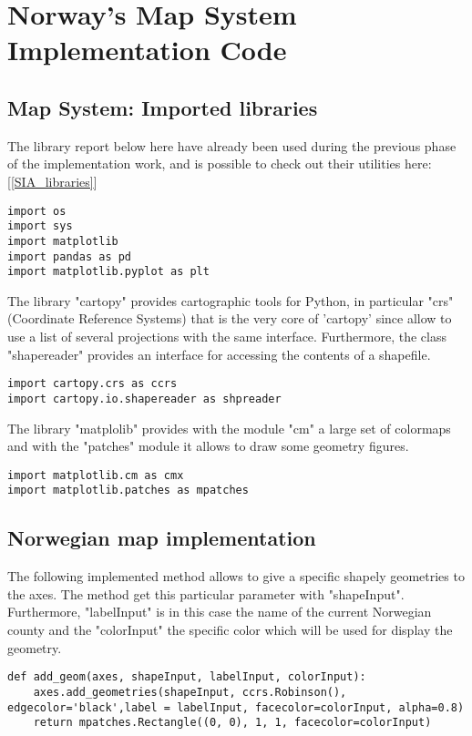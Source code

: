 \chapter{Norway's Map System Implementation Code}
\label{Map_System}
\section{Map System: Imported libraries}
\label{Map_libraries}
The library report below here have already been used during the previous phase of the implementation work, and is possible to check out their utilities here: [\ref{SIA_libraries}]
\begin{lstlisting}
import os
import sys
import matplotlib
import pandas as pd
import matplotlib.pyplot as plt
\end{lstlisting}

The library "cartopy" provides cartographic tools for Python, in particular "crs" (Coordinate Reference Systems) that is the very core of 'cartopy' since allow to use a list of several projections with the same interface. Furthermore, the class "shapereader" provides an interface for accessing the contents of a shapefile.
\begin{lstlisting}
import cartopy.crs as ccrs
import cartopy.io.shapereader as shpreader
\end{lstlisting}

The library "matplolib" provides with the module "cm" a large set of colormaps and with the "patches" module it allows to draw some geometry figures.
\begin{lstlisting}
import matplotlib.cm as cmx
import matplotlib.patches as mpatches
\end{lstlisting}

\section{Norwegian map implementation}
\label{Map_system_implementation}
The following implemented method allows to give a specific shapely geometries to the axes. The method get this particular parameter with "shapeInput". Furthermore, "labelInput" is in this case the name of the current Norwegian county and the "colorInput" the specific color which will be used for display the geometry.
\begin{lstlisting}
def add_geom(axes, shapeInput, labelInput, colorInput):
	axes.add_geometries(shapeInput, ccrs.Robinson(), edgecolor='black',label = labelInput, facecolor=colorInput, alpha=0.8)
	return mpatches.Rectangle((0, 0), 1, 1, facecolor=colorInput)
\end{lstlisting}

